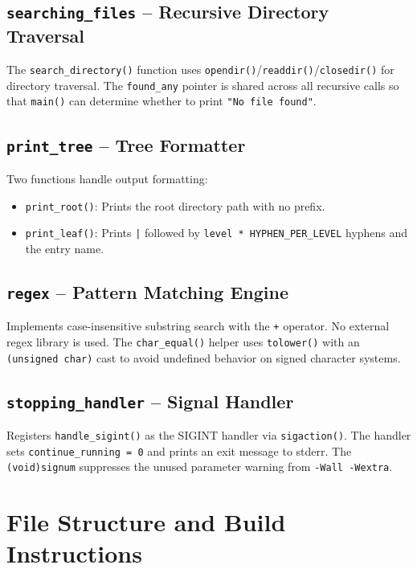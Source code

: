 \documentclass[12pt, a4paper]{article}
\begin{document}
\subsection{\texttt{searching\_files} -- Recursive Directory Traversal}

The \texttt{search\_directory()} function uses \texttt{opendir()}/\texttt{readdir()}/\texttt{closedir()}
for directory traversal. The \texttt{found\_any} pointer is shared across all recursive
calls so that \texttt{main()} can determine whether to print \texttt{"No file found"}.

\subsection{\texttt{print\_tree} -- Tree Formatter}

Two functions handle output formatting:
\begin{itemize}[noitemsep]
    \item \texttt{print\_root()}: Prints the root directory path with no prefix.
    \item \texttt{print\_leaf()}: Prints \texttt{|} followed by \texttt{level * HYPHEN\_PER\_LEVEL} hyphens and the entry name.
\end{itemize}

\subsection{\texttt{regex} -- Pattern Matching Engine}

Implements case-insensitive substring search with the \texttt{+} operator. No external
regex library is used. The \texttt{char\_equal()} helper uses \texttt{tolower()} with an
\texttt{(unsigned char)} cast to avoid undefined behavior on signed character systems.

\subsection{\texttt{stopping\_handler} -- Signal Handler}

Registers \texttt{handle\_sigint()} as the SIGINT handler via \texttt{sigaction()}.
The handler sets \texttt{continue\_running = 0} and prints an exit message to stderr.
The \texttt{(void)signum} suppresses the unused parameter warning from \texttt{-Wall -Wextra}.

\section{File Structure and Build Instructions}
\end{document}
